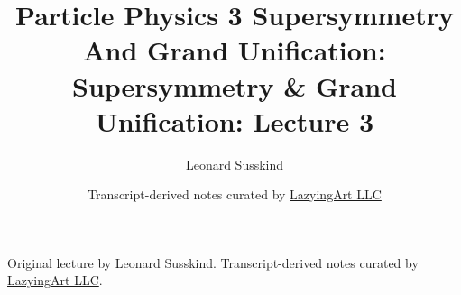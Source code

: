 \documentclass[11pt,oneside]{book}
\begin{document}
\frontmatter
\title{Particle Physics 3 Supersymmetry And Grand Unification: Supersymmetry \& Grand Unification: Lecture 3}
\author{Leonard Susskind}
\date{Transcript-derived notes curated by \href{https://lazying.art}{LazyingArt LLC}}
\maketitle
\begin{center}
\small Original lecture by Leonard Susskind. Transcript-derived notes curated by \href{https://lazying.art}{LazyingArt LLC}.
\end{center}
\clearpage
\mainmatter

\end{document}
